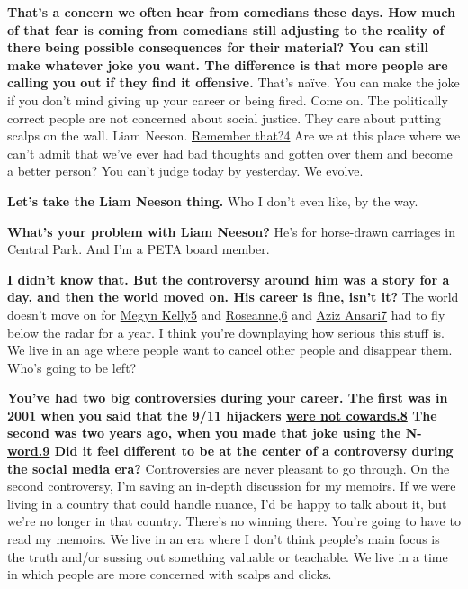 \textbf{That's a concern we often hear from comedians these days. How
much of that fear is coming from comedians still adjusting to the
reality of there being possible consequences for their material? You can
still make whatever joke you want. The difference is that more people
are calling you out if they find it offensive.} That's naïve. You can
make the joke if you don't mind giving up your career or being fired.
Come on. The politically correct people are not concerned about social
justice. They care about putting scalps on the wall. Liam Neeson.
\href{http://nytimes3xbfgragh.onion\#tooltip-4}{Remember that?4} Are we
at this place where we can't admit that we've ever had bad thoughts and
gotten over them and become a better person? You can't judge today by
yesterday. We evolve.

\textbf{Let's take the Liam Neeson thing.} Who I don't even like, by the
way.

\textbf{What's your problem with Liam Neeson?} He's for horse-drawn
carriages in Central Park. And I'm a PETA board member.

\textbf{I didn't know that. But the controversy around him was a story
for a day, and then the world moved on. His career is fine, isn't it?}
The world doesn't move on for
\href{http://nytimes3xbfgragh.onion\#tooltip-5}{Megyn Kelly5} and
\href{http://nytimes3xbfgragh.onion\#tooltip-6}{Roseanne,6} and
\href{http://nytimes3xbfgragh.onion\#tooltip-7}{Aziz Ansari7} had to fly
below the radar for a year. I think you're downplaying how serious this
stuff is. We live in an age where people want to cancel other people and
disappear them. Who's going to be left?

\textbf{You've had two big controversies during your career. The first
was in 2001 when you said that the 9/11 hijackers
\href{http://nytimes3xbfgragh.onion\#tooltip-8}{were not
cowards.}\href{http://nytimes3xbfgragh.onion\#tooltip-8}{8} The second
was two years ago, when you made that joke
\href{http://nytimes3xbfgragh.onion\#tooltip-9}{using the N-word.9} Did
it feel different to be at the center of a controversy during the social
media era?} Controversies are never pleasant to go through. On the
second controversy, I'm saving an in-depth discussion for my memoirs. If
we were living in a country that could handle nuance, I'd be happy to
talk about it, but we're no longer in that country. There's no winning
there. You're going to have to read my memoirs. We live in an era where
I don't think people's main focus is the truth and/or sussing out
something valuable or teachable. We live in a time in which people are
more concerned with scalps and clicks.


